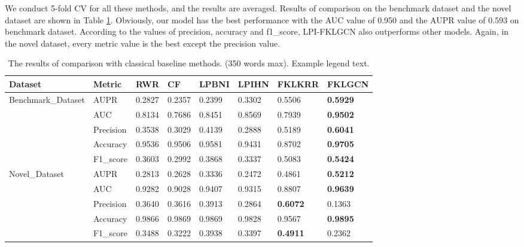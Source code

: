 \documentclass[fleqn,10pt]{wlscirep}
\begin{document}
We conduct 5-fold CV for all these methods, and the results are averaged. Results of comparison on the benchmark dataset and the novel dataset are shown in Table \ref{tab:Comparison1}. Obviously, our model has the best performance with the AUC value of 0.950 and the AUPR value of 0.593 on benchmark dataset. According to the values of precision, accuracy and f1\_score, LPI-FKLGCN also outperforms other models. Again, in the novel dataset, every metric value is the best except the precision value.

\begin{table}[ht]
\centering
\caption{\label{tab:Comparison1}The results of comparison with classical baseline methods. (350 words max). Example legend text.}
\begin{tabular}{|l|l|l|l|l|l|l|l|}
\hline
Dataset	& Metric & RWR	& CF & LPBNI & LPIHN & FKLKRR & FKLGCN \\
\hline
\multirow{5}{9em}{Benchmark_Dataset} 
& AUPR & 0.2827 & 0.2357 & 0.2399 & 0.3302 & 0.5506 & \bf{0.5929} \\ 
& AUC & 0.8134 & 0.7686	& 0.8451 & 0.8569 & 0.7939 & \bf{0.9502} \\
& Precision	& 0.3538  & 0.3029 & 0.4139 & 0.2888 & 0.5189 & \bf{0.6041} \\
& Accuracy	& 0.9536 & 0.9506 & 0.9581 & 0.9431 & 0.8702 & \bf{0.9705} \\
& F1_score & 0.3603 & 0.2992 & 0.3868 & 0.3337 & 0.5083 & \bf{0.5424} \\
\hline
\multirow{5}{9em}{Novel_Dataset} 
&AUPR	&0.2813	&0.2628	&0.3336	&0.2472	&0.4861	& \bf{0.5212}\\
&AUC	&0.9282	&0.9028	&0.9407	&0.9315	&0.8807	& \bf{0.9639}\\
&Precision	&0.3640	&0.3616	&0.3913	&0.2864	&\bf{0.6072}	& 0.1363\\
&Accuracy	&0.9866	&0.9869	&0.9869	&0.9828	&0.9567	& \bf{0.9895}\\
&F1_score	&0.3488	&0.3222	&0.3938	&0.3397	&\bf{0.4911}	&0.2362\\
\hline
\end{tabular}
\end{table}
\end{document}
